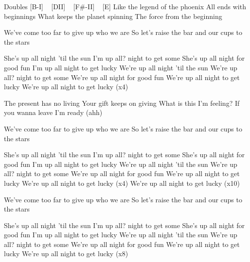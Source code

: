 Doubles
[B-I] ~ [DII] ~ [F#-II] ~ [E]
Like the legend of the phoenix
All ends with beginnings
What keeps the planet spinning
The force from the beginning

We've come too far to give up who we are
So let's raise the bar and our cups to the stars

She's up all night 'til the sun
I'm up all? night to get some
She's up all night for good fun
I'm up all night to get lucky
We're up all night 'til the sun
We're up all? night to get some
We're up all night for good fun
We're up all night to get lucky
We're up all night to get lucky (x4)

The present has no living
Your gift keeps on giving
What is this I'm feeling?
If you wanna leave I'm ready (ahh)

We've come too far to give up who we are
So let's raise the bar and our cups to the stars

She's up all night 'til the sun
I'm up all? night to get some
She's up all night for good fun
I'm up all night to get lucky
We're up all night 'til the sun
We're up all? night to get some
We're up all night for good fun
We're up all night to get lucky
We're up all night to get lucky (x4)
We're up all night to get lucky (x10)

We've come too far to give up who we are
So let's raise the bar and our cups to the stars

She's up all night 'til the sun
I'm up all? night to get some
She's up all night for good fun
I'm up all night to get lucky
We're up all night 'til the sun
We're up all? night to get some
We're up all night for good fun
We're up all night to get lucky
We're up all night to get lucky (x8) 